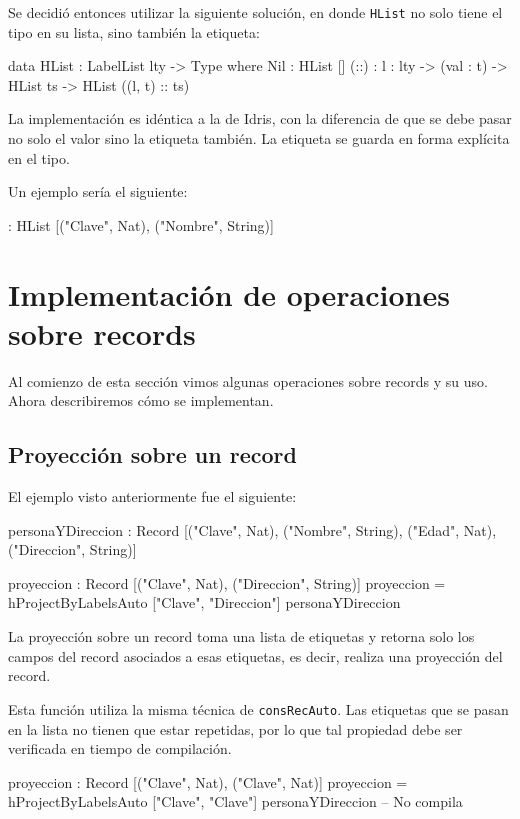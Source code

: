 Se decidió entonces utilizar la siguiente solución, en donde \texttt{HList} no solo tiene el tipo en su lista, sino también la etiqueta:

\begin{code}
data HList : LabelList lty -> Type where
  Nil : HList []
  (::) : {l : lty} -> (val : t) -> HList ts ->
    HList ((l, t) :: ts)
\end{code}

La implementación es idéntica a la de Idris, con la diferencia de que se debe pasar no solo el valor sino la etiqueta también. La etiqueta se guarda en forma explícita en el tipo.

Un ejemplo sería el siguiente:

\begin{code}
[1, "Juan"] :
  HList [("Clave", Nat), ("Nombre", String)]
\end{code}

\section{Implementación de operaciones sobre records}

Al comienzo de esta sección vimos algunas operaciones sobre records y su uso. Ahora describiremos cómo se implementan.

\subsection{Proyección sobre un record}

El ejemplo visto anteriormente fue el siguiente:

\begin{code}
personaYDireccion : Record [("Clave", Nat), ("Nombre", String),
  ("Edad", Nat), ("Direccion", String)]

proyeccion : Record [("Clave", Nat), ("Direccion", String)]
proyeccion = hProjectByLabelsAuto ["Clave", "Direccion"]
  personaYDireccion
\end{code}

La proyección sobre un record toma una lista de etiquetas y retorna solo los campos del record asociados a esas etiquetas, es decir, realiza una proyección del record.

Esta función utiliza la misma técnica de \texttt{consRecAuto}. Las etiquetas que se pasan en la lista no tienen que estar repetidas, por lo que tal propiedad debe ser verificada en tiempo de compilación. 

\begin{code}
proyeccion : Record [("Clave", Nat), ("Clave", Nat)]
proyeccion = hProjectByLabelsAuto ["Clave", "Clave"]
  personaYDireccion
-- No compila
\end{code}

